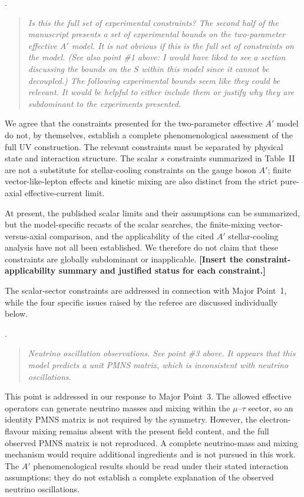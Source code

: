 \documentclass[12pt,a4paper]{article}
\begin{document}
\medskip
{}.
\begin{quote}\itshape
Is this the full set of experimental constraints? The second half of the manuscript presents a set of experimental bounds on the two-parameter effective \(A'\) model. It is not obvious if this is the full set of constraints on the model. (See also point \#1 above: I would have liked to see a section discussing the bounds on the \(S\) within this model since it cannot be decoupled.) The following experimental bounds seem like they could be relevant. It would be helpful to either include them or justify why they are subdominant to the experiments presented.
\end{quote}


We agree that the constraints presented for the two-parameter effective \(A'\) model do not, by themselves, establish a complete phenomenological assessment of the full UV construction. The relevant constraints must be separated by physical state and interaction structure. The scalar \(s\) constraints summarized in Table~II are not a substitute for stellar-cooling constraints on the gauge boson \(A'\); finite vector-like-lepton effects and kinetic mixing are also distinct from the strict pure-axial effective-current limit.

At present, the published scalar limits and their assumptions can be summarized, but the model-specific recasts of the scalar searches, the finite-mixing vector-versus-axial comparison, and the applicability of the cited \(A'\) stellar-cooling analysis have not all been established. We therefore do not claim that these constraints are globally subdominant or inapplicable. \textbf{[Insert the constraint-applicability summary and justified status for each constraint.]}

The scalar-sector constraints are addressed in connection with Major Point~1, while the four specific issues raised by the referee are discussed individually below.

\medskip
{}.
\begin{quote}\itshape
Neutrino oscillation observations. See point \#3 above. It appears that this model predicts a unit PMNS matrix, which is inconsistent with neutrino oscillations.
\end{quote}


This point is addressed in our response to Major Point~3. The allowed effective operators can generate neutrino masses and mixing within the \(\mu\)--\(\tau\) sector, so an identity PMNS matrix is not required by the symmetry. However, the electron-flavour mixing remains absent with the present field content, and the full observed PMNS matrix is not reproduced. A complete neutrino-mass and mixing mechanism would require additional ingredients and is not pursued in this work. The \(A'\) phenomenological results should be read under their stated interaction assumptions; they do not establish a complete explanation of the observed neutrino oscillations.
\end{document}
